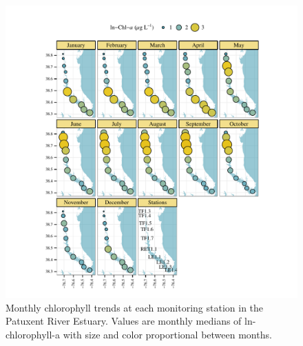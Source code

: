 \documentclass[letterpaper,12pt,oneside]{article}\usepackage[]{graphicx}\usepackage[]{color}
\makeatletter
\def\maxwidth{ %
  \ifdim\Gin@nat@width>\linewidth
    \linewidth
  \else
    \Gin@nat@width
  \fi
}
\makeatother
\begin{document}
\begin{figure}[!ht]

{\centering \includegraphics[width=\maxwidth]{figs/chlmo-1} 

}

\caption[Monthly chlorophyll trends at each monitoring station in the Patuxent River Estuary]{Monthly chlorophyll trends at each monitoring station in the Patuxent River Estuary.  Values are monthly medians of ln-chlorophyll-a with size and color proportional between months.}\label{fig:chlmo}
\end{figure}








\end{document}
